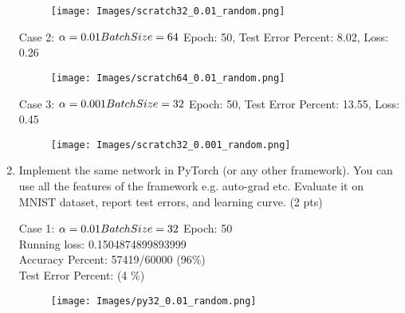 \documentclass[a4paper]{article}
\theoremstyle{definition}
\newenvironment{soln}{
    \leavevmode\color{blue}\ignorespaces
}{}
\begin{document}
\begin{enumerate}
\begin{soln}
\begin{figure}[H]
                \centering
                \texttt{[image: Images/scratch32\_0.01\_random.png]}
            
        \end{figure}     
         Case 2: $\\
        \alpha = 0.01 \\
        BatchSize = 64 \\
        $
        Epoch: 50, Test Error Percent: 8.02, Loss: 0.26
        \begin{figure}[H]
            
                \centering
                \texttt{[image: Images/scratch64\_0.01\_random.png]}
            
        \end{figure} 
        Case 3: $\\
        \alpha = 0.001 \\
        BatchSize = 32 \\
        $
        Epoch: 50, Test Error Percent: 13.55, Loss: 0.45
        \begin{figure}[H]
            
                \centering
                \texttt{[image: Images/scratch32\_0.001\_random.png]}
            
        \end{figure} 
    \end{soln}
    \item Implement the same network in PyTorch (or any other framework). You can use all the features of the framework e.g. auto-grad etc. Evaluate it on MNIST dataset, report test errors, and learning curve. (2 pts)
       \begin{soln}
        Case 1: $\\
        \alpha = 0.01 \\
        BatchSize = 32 \\
         $
         Epoch:  50 \\
    Running loss:  0.1504874899893999 \\

    Accuracy Percent: 57419/60000 (96\%) \\


Test Error Percent: (4 \%) \\
\begin{figure}[H]
            
                \centering
                \texttt{[image: Images/py32\_0.01\_random.png]}
            

\end{figure}
\end{soln}
\end{enumerate}
\end{document}
